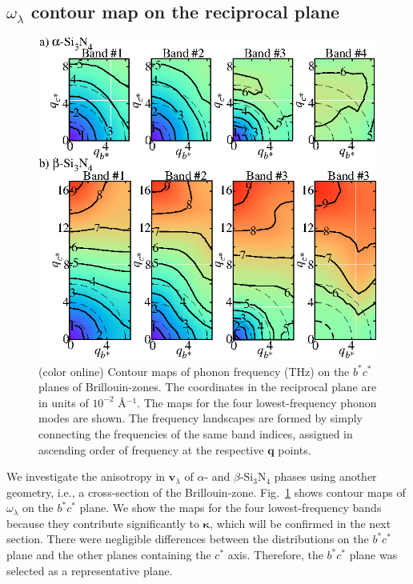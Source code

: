 \documentclass[twocolumn,amsmath,amssymb,a4paper,prb,superscriptaddress,floatfix]{revtex4-1}
\begin{document}
\subsection{$\omega_\lambda$ contour map on the reciprocal plane}

\begin{figure}[ht]
 \centerins
  \includegraphics[width=\linewidth]{Fig2_small.eps} \caption{(color
  online) Contour maps of phonon frequency (THz) on the $b^*c^*$
  planes of Brillouin-zones. The coordinates in the reciprocal plane 
   are in units of $10^{-2}$ \AA$^{-1}$. The maps for the four lowest-frequency
  phonon modes are shown. The frequency landscapes are formed by simply
  connecting the frequencies of the same band indices, assigned in
  ascending order of frequency at the respective $\mathbf {q}$
  points. \label{fig:Fig3_338} }
 \centering
\end{figure}

We investigate the anisotropy in $\mathbf{v}_{\lambda}$ of $\alpha$- and
$\beta$-Si$_3$N$_4$ phases using another geometry, i.e., a cross-section of the
Brillouin-zone. Fig.~\ref{fig:Fig3_338} shows contour maps of
$\omega_{\lambda}$  on the $b^*c^*$ plane.  We show the maps for the four
lowest-frequency bands because they contribute significantly to
$\boldsymbol{\kappa}$, which will be confirmed in the next section. There were
negligible differences between the distributions on the $b^*c^*$ plane and the
other planes containing the $c^*$ axis.  Therefore, the $b^*c^*$ plane was
selected as a representative plane.  
\end{document}
